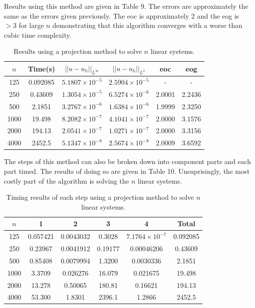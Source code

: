 \documentclass{article}
\numberwithin{equation}{section}
\begin{document}
Results using this method are given in Table 9. The errors are approximately the same as the errors given previously. The eoc is approximately 2 and the eog is $> 3$ for large $n$ demonstrating that this algorithm converges with a worse than cubic time complexity. 
\begin{table}[H]
\centering
\begin{tabular}{|c|c|c|c|c|c|}
\hline
$n$ & Time(s) & $|| u - u_h ||_{L^{\infty}}$ &$|| u - u_h ||_{L^{2}}$ & eoc & eog \\
\hline
125 & 0.092085 & $5.1807 \times 10^{-5}$ & $2.5904 \times 10^{-5}$ & - & - \\
250 & 0.43609 & $1.3054 \times 10^{-5}$ & $6.5274 \times 10^{-6}$ & 2.0001 & 2.2436 \\
500 & 2.1851 & $3.2767 \times 10^{-6}$ & $1.6384 \times 10^{-6}$ & 1.9999 & 2.3250 \\
1000 & 19.498 & $8.2082 \times 10^{-7}$ & $4.1041 \times 10^{-7}$ & 2.0000 & 3.1576 \\
2000 & 194.13 & $2.0541 \times 10^{-7}$ & $1.0271 \times 10^{-7}$ & 2.0000 & 3.3156 \\
4000 & 2452.5 & $5.1347 \times 10^{-8}$ & $2.5674 \times 10^{-8}$ & 2.0009 & 3.6592  \\
\hline
\end{tabular}
\captionsetup{justification=centering}
\caption{Results using a projection method to solve $n$ linear systems.}
\end{table}

The steps of this method can also be broken down into component parts and each part timed. The results of doing so are given in Table 10. Unsuprisingly, the most costly part of the algorithm is solving the $n$ linear systems. 

\begin{table}[H]
\centering
\begin{tabular}{|c|c|c|c|c|c|}
\hline
$n$ & 1 & 2 & 3 & 4 & Total \\
\hline
125 & 0.057421 & 0.0043032 & 0.3028 & $7.1764 \times 10^{-7}$ & 0.092085 \\
250 & 0.23967 & 0.0041912 & 0.19177 & 0.00046206 & 0.43609  \\
500 & 0.85408 & 0.0079994 & 1.3200 & 0.0030336 & 2.1851 \\
1000 & 3.3709 & 0.026276 & 16.079 & 0.021675 & 19.498 \\
2000 & 13.278 & 0.50065 & 180.81 & 0.16621 & 194.13 \\
4000 & 53.300 & 1.8301 & 2396.1 & 1.2866 & 2452.5  \\
\hline
\end{tabular}
\captionsetup{justification=centering}
\caption{Timing results of each step using a projection method to solve $n$ linear systems.}
\end{table}
\end{document}
